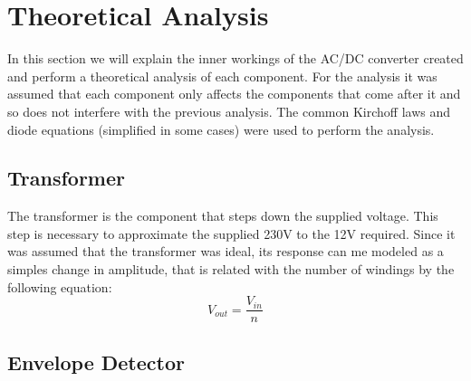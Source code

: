 
\section{Theoretical Analysis}
\label{sec:analysis}



In this section we will explain the inner workings of the AC/DC converter created and perform a theoretical analysis of each component. For the analysis it was assumed that each component only affects the components that come after it and so does not interfere with the previous analysis.
The common Kirchoff laws and diode equations (simplified in some cases) were used to perform the analysis.


\subsection{Transformer}
\label{subsec:transf}

The transformer is the component that steps down the supplied voltage. This step is necessary to approximate the supplied 230V to the 12V required. Since it was assumed that the transformer was ideal, its response can me modeled as a simples change in amplitude, that is related with the number of windings by the following equation:
\[
V_{out}=\frac{V_{in}}{n}
\]


\subsection{Envelope Detector}
\label{subsec:envdet}

